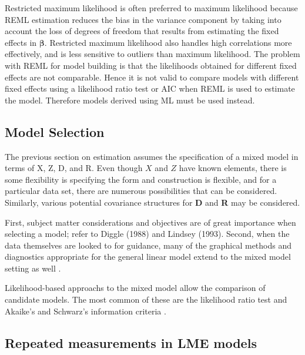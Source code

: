 \documentclass[12pt, a4paper]{report}
\theoremstyle{plain}
\theoremstyle{definition}
\theoremstyle{remark}
\begin{document}
	Restricted maximum likelihood is often preferred to maximum likelihood because REML estimation reduces the bias in the variance component by taking into account the loss of degrees of freedom that results
	from estimating the fixed effects in $\boldsymbol{\beta}$. Restricted maximum likelihood also handles high correlations more effectively, and is less sensitive to outliers than maximum likelihood.  The problem with REML for model building is that the likelihoods obtained for different fixed effects are not comparable. Hence it is not valid to compare models with different fixed effects using a likelihood ratio test or AIC when REML is used to
	estimate the model. Therefore models derived using ML must be used instead.
	
	
	
	
	
	
	
	
	
	
	
	\subsection{Model Selection} The previous section on estimation assumes
	the specification of a mixed model in terms of X, Z, D, and R.
	Even though $X$ and $Z$ have known elements, there is some
	flexibility is specifying the form and construction is flexible,
	and for a particular data set, there are numerous possibilities
	that can be considered. Similarly, various potential covariance
	structures for \textbf{D} and \textbf{R} may be considered.
	
	First, subject matter considerations and objectives are of great
	importance when selecting a model; refer to Diggle (1988) and
	Lindsey (1993). Second, when the data themselves are looked to for guidance, many
	of the graphical methods and diagnostics appropriate for the
	general linear model extend to the mixed model setting as well \citep{chincilli}.
	
	
	Likelihood-based approachs to the mixed model allow the comparison
	of candidate models. The most common of these are the likelihood
	ratio test and Akaike's and Schwarz's information criteria
	\citep{wolfinger1993, bozdogan1987}.
	
	
	
	
	
	\subsection{Repeated measurements in LME models}
	
\end{document}
